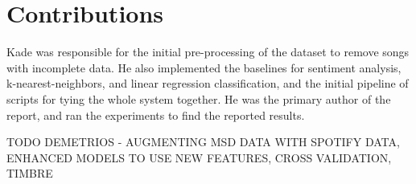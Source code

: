 \documentclass[10pt,journal,compsoc]{IEEEtran}
\begin{document}
\section{Contributions}
Kade was responsible for the initial pre-processing of the dataset to remove songs with incomplete data. He also implemented the baselines for sentiment analysis, k-nearest-neighbors, and linear regression classification, and the initial pipeline of scripts for tying the whole system together. He was the primary author of the report, and ran the experiments to find the reported results.

TODO DEMETRIOS - AUGMENTING MSD DATA WITH SPOTIFY DATA, ENHANCED MODELS TO USE NEW FEATURES, CROSS VALIDATION, TIMBRE

{}


%

\end{document}
